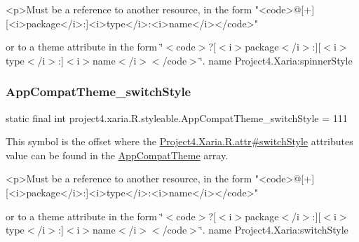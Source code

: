 \begin{DoxyVerb}      <p>Must be a reference to another resource, in the form "<code>@[+][<i>package</i>:]<i>type</i>:<i>name</i></code>"
\end{DoxyVerb}
 or to a theme attribute in the form \char`\"{}$<$code$>$?\mbox{[}$<$i$>$package$<$/i$>$\+:\mbox{]}\mbox{[}$<$i$>$type$<$/i$>$\+:\mbox{]}$<$i$>$name$<$/i$>$$<$/code$>$\char`\"{}.  name Project4.\+Xaria\+:spinner\+Style \mbox{\label{classproject4_1_1xaria_1_1R_1_1styleable_a33d0593c2cd3f80d60995b4580bed2db}} 
\subsubsection{\texorpdfstring{App\+Compat\+Theme\+\_\+switch\+Style}{AppCompatTheme\_switchStyle}}
{\footnotesize\ttfamily static final int project4.\+xaria.\+R.\+styleable.\+App\+Compat\+Theme\+\_\+switch\+Style = 111\hspace{0.3cm}{\ttfamily [static]}}

This symbol is the offset where the \hyperlink{}{Project4.\+Xaria.\+R.\+attr\#switch\+Style} attribute\textquotesingle{}s value can be found in the \hyperlink{classproject4_1_1xaria_1_1R_1_1styleable_aad8bec413e2350f9404e6ff0e831a85d}{App\+Compat\+Theme} array.

\begin{DoxyVerb}      <p>Must be a reference to another resource, in the form "<code>@[+][<i>package</i>:]<i>type</i>:<i>name</i></code>"
\end{DoxyVerb}
 or to a theme attribute in the form \char`\"{}$<$code$>$?\mbox{[}$<$i$>$package$<$/i$>$\+:\mbox{]}\mbox{[}$<$i$>$type$<$/i$>$\+:\mbox{]}$<$i$>$name$<$/i$>$$<$/code$>$\char`\"{}.  name Project4.\+Xaria\+:switch\+Style \mbox{\label{classproject4_1_1xaria_1_1R_1_1styleable_a0f3ef906935af92b8a0555a151cdb0a4}} 
